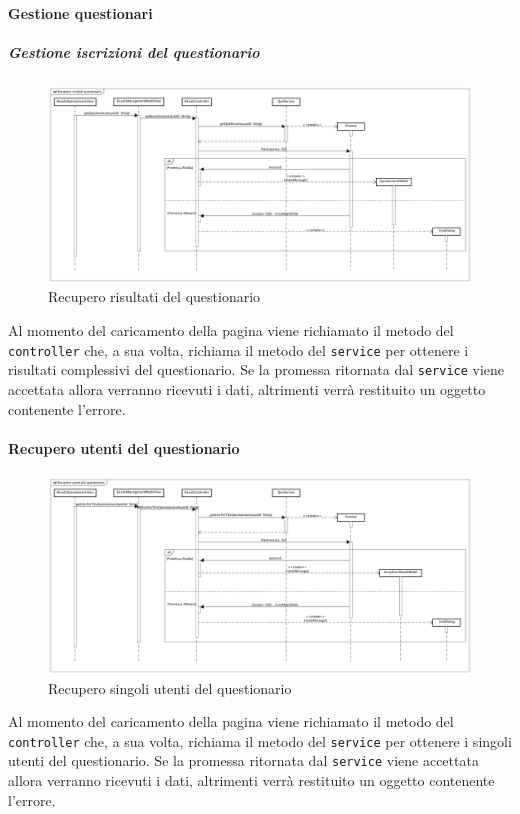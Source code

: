 \paragraph{Gestione questionari}

\subparagraph{Gestione iscrizioni del questionario}
\label{Recupero risultati del questionario}
\begin{figure}[ht]
	\centering
	\includegraphics[scale=0.25,keepaspectratio]{UML/DiagrammiDiSequenza/Front-end/ResultsManagement.png}
	\caption{Recupero risultati del questionario}
\end{figure} \FloatBarrier
 
Al momento del caricamento della pagina viene richiamato il metodo del \texttt{controller} che, a sua volta, richiama il metodo del \texttt{service} per ottenere i risultati complessivi del questionario. Se la promessa ritornata dal \texttt{service} viene accettata allora verranno ricevuti i dati, altrimenti verrà restituito un oggetto contenente l'errore.


\paragraph{Recupero utenti del questionario}
\label{Recupero utenti del questionario}
\begin{figure}[ht]
	\centering
	\includegraphics[scale=0.25,keepaspectratio]{UML/DiagrammiDiSequenza/Front-end/GetUsersForQuestionnaire.png}
	\caption{Recupero singoli utenti del questionario}
\end{figure} \FloatBarrier

Al momento del caricamento della pagina viene richiamato il metodo del \texttt{controller} che, a sua volta, richiama il metodo del \texttt{service} per ottenere i singoli utenti del questionario. Se la promessa ritornata dal \texttt{service} viene accettata allora verranno ricevuti i dati, altrimenti verrà restituito un oggetto contenente l'errore.

